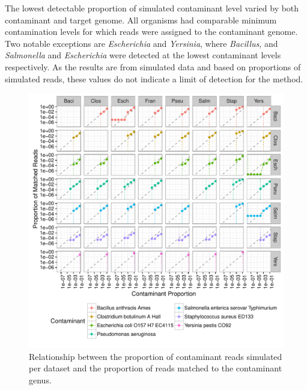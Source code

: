 \documentclass[fleqn,10pt,lineno]{wlpeerj}\usepackage[]{graphicx}\usepackage[]{color}
\makeatletter
\def\maxwidth{ %
  \ifdim\Gin@nat@width>\linewidth
    \linewidth
  \else
    \Gin@nat@width
  \fi
}
\newenvironment{knitrout}{}{} %
\makeatother
\begin{document}
The lowest detectable proportion of simulated contaminant level varied by both contaminant and target genome. 
All organisms had comparable minimum contamination levels for which reads were assigned to the contaminant genome. 
Two notable exceptions are \textit{Escherichia} and \textit{Yersinia}, where \textit{Bacillus}, and \textit{Salmonella} and \textit{Escherichia} were detected at the lowest contaminant levels respectively. 
As the results are from simulated data and based on proportions of simulated reads, these values do not indicate a limit of detection for the method.

\begin{knitrout}
\color{fgcolor}\begin{figure}
\includegraphics[width=\maxwidth]{figure/contam_min-1} \caption[Relationship between the proportion of contaminant reads simulated per dataset and the proportion of reads matched to the contaminant genus]{Relationship between the proportion of contaminant reads simulated per dataset and the proportion of reads matched to the contaminant genus.}\label{fig:contam_min}
\end{figure}


\end{knitrout}
\end{document}
